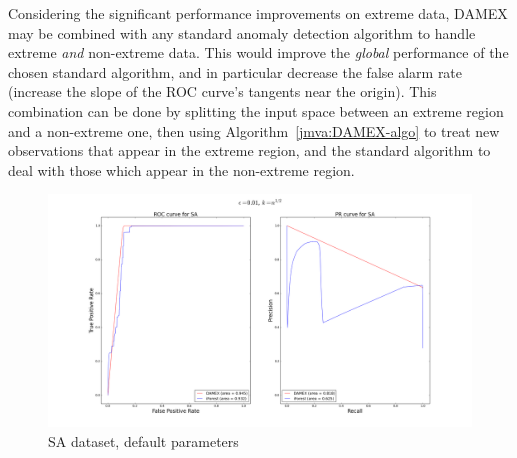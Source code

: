 Considering the significant performance improvements on extreme data,
DAMEX may be combined with any standard anomaly detection algorithm to handle extreme
\emph{and} non-extreme data. This would improve the \emph{global}
performance of the chosen standard algorithm, and in particular
decrease the false alarm rate (increase the slope of the ROC curve's tangents near
the origin).  This combination can be done %
by splitting the input space between an
extreme region and a non-extreme one, then using
Algorithm~\ref{jmva:DAMEX-algo} to treat new observations that appear in
the extreme region, and the standard algorithm to deal with those which
appear in the non-extreme region.  %


\begin{figure}[!ht]
  \centering
  \includegraphics[width = \textwidth]{fig_source/SA-lb-semi-supervised-average-rect-01.png}
  \caption{SA dataset, default parameters}
  \label{jmva:fig:SA}
\end{figure}

